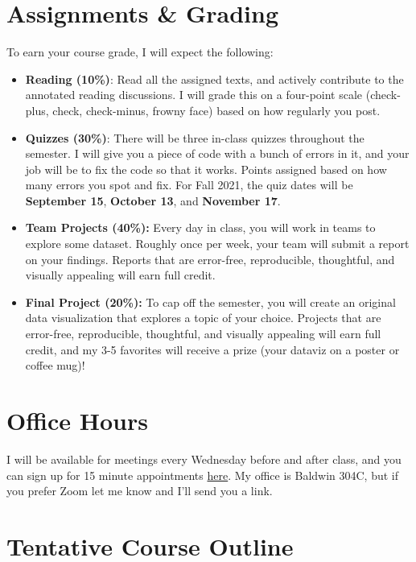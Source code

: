 \documentclass[11pt, letterpaper]{article}
\begin{document}
\section*{Assignments \& Grading}

To earn your course grade, I will expect the following:

\begin{itemize}
	\item \textbf{Reading (10\%)}: Read all the assigned texts, and actively contribute to the annotated reading discussions. I will grade this on a four-point scale (check-plus, check, check-minus, frowny face) based on how regularly you post.
	\item \textbf{Quizzes (30\%)}: There will be three in-class quizzes throughout the semester. I will give you a piece of code with a bunch of errors in it, and your job will be to fix the code so that it works. Points assigned based on how many errors you spot and fix. For Fall 2021, the quiz dates will be \textbf{September 15}, \textbf{October 13}, and \textbf{November 17}.
	\item \textbf{Team Projects (40\%):} Every day in class, you will work in teams to explore some dataset. Roughly once per week, your team will submit a report on your findings. Reports that are error-free, reproducible, thoughtful, and visually appealing will earn full credit.
	\item \textbf{Final Project (20\%):} To cap off the semester, you will create an original data visualization that explores a topic of your choice. Projects that are error-free, reproducible, thoughtful, and visually appealing will earn full credit, and my 3-5 favorites will receive a prize (your dataviz on a poster or coffee mug)!
\end{itemize}

\section*{Office Hours}
I will be available for meetings every Wednesday before and after class, and you can sign up for 15 minute appointments \href{https://calendly.com/jornstein/15min}{here}. My office is Baldwin 304C, but if you prefer Zoom let me know and I'll send you a link.


\section*{Tentative Course Outline}
\end{document}
